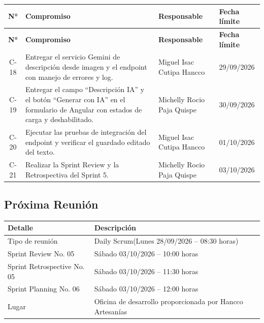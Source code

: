 \documentclass[12pt,a4paper]{article}
\begin{document}
{\small
\begin{longtable}{c p{7.8cm} p{4.2cm} p{2.0cm}}
\toprule
\textbf{N°} & \textbf{Compromiso} & \textbf{Responsable} & \textbf{Fecha límite} \\
\midrule
\endfirsthead

\toprule
\textbf{N°} & \textbf{Compromiso} & \textbf{Responsable} & \textbf{Fecha límite} \\
\midrule
\endhead

\bottomrule
\endlastfoot

C-18 & Entregar el servicio Gemini de descripción desde imagen y el endpoint con manejo de errores y log. & Miguel Isac Cutipa Hancco & 29/09/2026 \\
C-19 & Entregar el campo ``Descripción IA'' y el botón ``Generar con IA'' en el formulario de Angular con estados de carga y deshabilitado. & Michelly Rocio Paja Quispe & 30/09/2026 \\
C-20 & Ejecutar las pruebas de integración del endpoint y verificar el guardado editado del texto. & Miguel Isac Cutipa Hancco & 01/10/2026 \\
C-21 & Realizar la Sprint Review y la Retrospectiva del Sprint 5. & Michelly Rocio Paja Quispe & 03/10/2026 \\

\end{longtable}
}

\subsection*{Próxima Reunión}

\begin{center}
\small
\begin{tabularx}{\textwidth}{p{4.5cm} L}
\toprule
\textbf{Detalle} & \textbf{Descripción} \\
\midrule
Tipo de reunión & Daily Scrum(Lunes 28/09/2026 -- 08:30 horas) \\
Sprint Review No. 05 & Sábado 03/10/2026 -- 10:00 horas \\
Sprint Retrospective No. 05 & Sábado 03/10/2026 -- 11:30 horas \\
Sprint Planning No. 06 & Sábado 03/10/2026 -- 12:00 horas \\
Lugar & Oficina de desarrollo proporcionada por Hancco Artesanías \\
\bottomrule
\end{tabularx}
\end{center}
\end{document}
